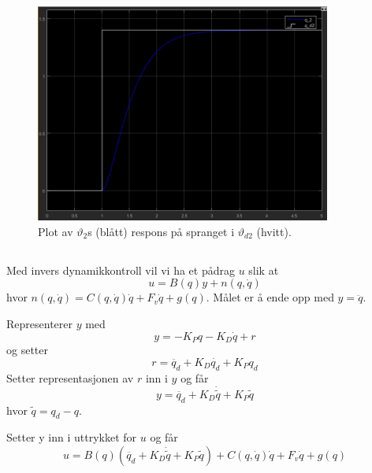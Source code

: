 \documentclass[norsk]{article}
\begin{document}
\begin{figure}[H]
\includegraphics[height=7.2cm]{illustrations/oppg3c_illu2}
\caption{Plot av \(\vartheta_2\)s (blått) respons på spranget i \(\vartheta_{d2}\) (hvitt).}
\end{figure}
\subsection{ }
Med invers dynamikkontroll vil vi ha et pådrag \(u\) slik at
\[u = B(q)y + n(q, \dot{q})\]
hvor \(n(q, \dot{q}) = C(q, \dot{q})\dot{q}+F_v\dot{q} + g(q)\). Målet er å ende opp med \(y = \ddot{q}\).

Representerer \(y\) med
\[y = -K_Pq -K_D\dot{q} + r\]
og setter
\[r = \ddot{q_d} + K_D\dot{q_d} + K_Pq_d\]
Setter representasjonen av \(r\) inn i \(y\) og får
\[y = \ddot{q_d} + K_D\dot{\tilde{q}} + K_P\tilde{q}\]
hvor \(\tilde{q} = q_d - q\).

Setter y inn i uttrykket for \(u\) og får
\[u = B(q)(\ddot{q_d} + K_D\dot{\tilde{q}} + K_P\tilde{q}) + C(q, \dot{q})\dot{q}+F_v\dot{q} + g(q)\]
\subsection{ }
\subsection{ }
\subsection{ }
\subsection{ }
\end{document}
